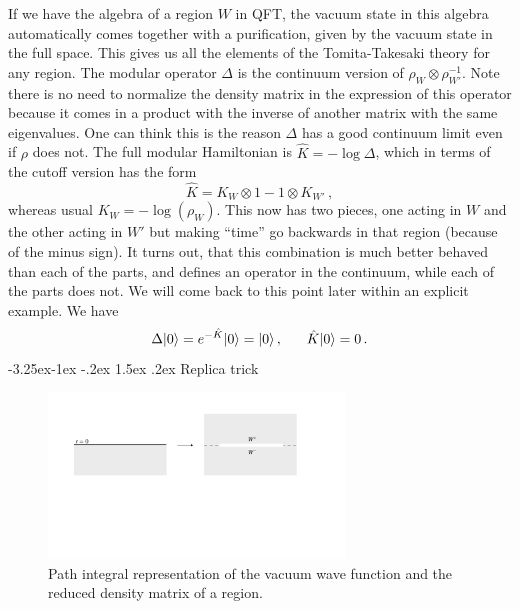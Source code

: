 \documentclass[11pt]{article}
\makeatletter
\renewcommand\subsection{\@startsection{subsection}{2}{\z@}%
                                   {-3.25ex\@plus -1ex \@minus -.2ex}%
                                     {1.5ex \@plus .2ex}%
                                     {\normalfont\bfseries}}
\numberwithin{equation}{section}
\newcommand{\be}{\begin{equation}}
\newcommand{\ee}{\end{equation}}
\makeatother
\begin{document}
If we have the algebra of a region $W$ in QFT, the vacuum state in this algebra automatically comes together with a purification, given by the vacuum state in the full space. This gives us all the elements of the Tomita-Takesaki theory for any region. The modular operator $\Delta$ is the continuum version of $\rho_W\otimes \rho_{W'}^{-1}$. Note there is no need to normalize the density matrix in the expression of this operator because it comes in a product with the inverse of another matrix with the same eigenvalues. One can think this is the reason $\Delta$ has a good continuum limit even if $\rho$ does not. The full modular Hamiltonian is $\hat{K}=-\log \Delta$, which in terms of the cutoff version has the form
\be 
\hat{K}= K_W \otimes 1 - 1\otimes K_{W'}\,,\label{full}
\ee
whereas usual $K_{W}=-\log(\rho_W)$. This now has two pieces, one acting in $W$ and the other acting in $W'$ but making ``time'' go backwards in that region (because of the minus sign). It turns out, that this combination is much better behaved than each of the parts, and defines an operator in the continuum, while each of the parts does not.  We will come back to this point later within an explicit example. We have
\be
\Delta |0\rangle=e^{-\hat{K}} |0\rangle=|0\rangle\,,\hspace{.6cm}   \hat{K} |0\rangle=0\,. 
\ee
\subsection{Replica trick}
\begin{figure}[t]
\begin{center}  
\includegraphics[width=0.7\textwidth]{replica.pdf}
\captionsetup{width=0.9\textwidth}
\caption{Path integral representation of the vacuum wave function and the reduced density matrix of a region. }
\label{replica}
\end{center}  
\end{figure} 
\end{document}
